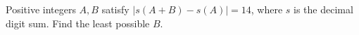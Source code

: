 Positive integers $A,B$ satisfy $|s(A+B)-s(A)|=14$, where $s$ is the decimal digit sum. Find the least possible $B$.

